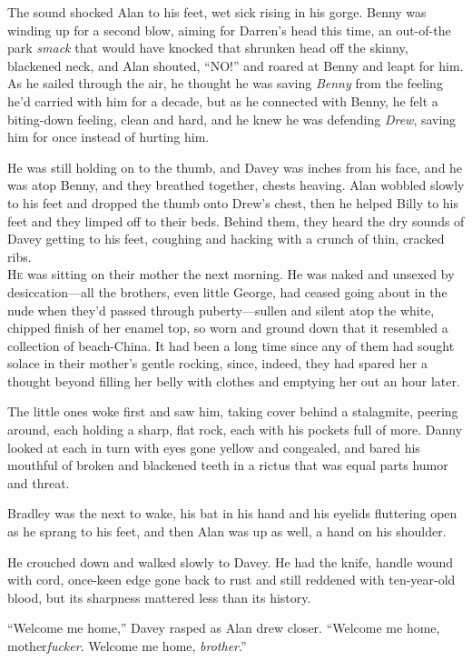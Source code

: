 \documentclass{article}
\begin{document}
The sound shocked Alan to his feet, wet sick rising in his gorge. 
Benny was winding up for a second blow, aiming for Darren's head this
time, an out-of-the park \textit{smack} that would have knocked that
shrunken head off the skinny, blackened neck, and Alan shouted,
``NO!'' and roared at Benny and leapt for him.  As he sailed through
the air, he thought he was saving \textit{Benny} from the feeling he'd
carried with him for a decade, but as he connected with Benny, he felt
a biting-down feeling, clean and hard, and he knew he was defending
\textit{Drew}, saving him for once instead of hurting him.

He was still holding on to the thumb, and Davey was inches from his
face, and he was atop Benny, and they breathed together, chests
heaving.  Alan wobbled slowly to his feet and dropped the thumb onto
Drew's chest, then he helped Billy to his feet and they limped off to
their beds.  Behind them, they heard the dry sounds of Davey getting
to his feet, coughing and hacking with a crunch of thin, cracked ribs.
\\
\lettrine[lines=3, lhang=.5, nindent=0pt, findent=2pt]{H}{e} was sitting on their mother the next morning.  He was naked and
unsexed by desiccation---all the brothers, even little George, had
ceased going about in the nude when they'd passed through
puberty---sullen and silent atop the white, chipped finish of her
enamel top, so worn and ground down that it resembled a collection of
beach-China.  It had been a long time since any of them had sought
solace in their mother's gentle rocking, since, indeed, they had
spared her a thought beyond filling her belly with clothes and
emptying her out an hour later.

The little ones woke first and saw him, taking cover behind a
stalagmite, peering around, each holding a sharp, flat rock, each with
his pockets full of more.  Danny looked at each in turn with eyes gone
yellow and congealed, and bared his mouthful of broken and blackened
teeth in a rictus that was equal parts humor and threat.

Bradley was the next to wake, his bat in his hand and his eyelids
fluttering open as he sprang to his feet, and then Alan was up as
well, a hand on his shoulder.

He crouched down and walked slowly to Davey.  He had the knife, handle
wound with cord, once-keen edge gone back to rust and still reddened
with ten-year-old blood, but its sharpness mattered less than its
history.

``Welcome me home,'' Davey rasped as Alan drew closer.  ``Welcome me
home, mother\textit{fucker}.  Welcome me home, \textit{brother}.''
\end{document}
